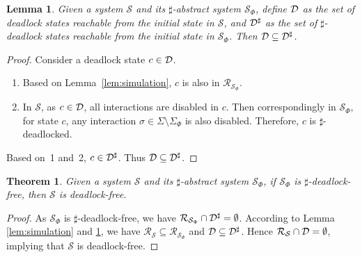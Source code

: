 \documentclass[10pt, a4paper, onecolumn, conference, compsocconf]{IEEEtran}
\newcommand{\sys}{\mathcal{S}}
\newtheorem{theo}{Theorem}
\newtheorem{lemma}{Lemma}
\begin{document}
\begin{lemma}\label{lem:deadlock}
Given a system $\sys$ and its $\sharp$-abstract system $\sys_{\Phi}$, define ${\cal{D}}$ as the set of deadlock states reachable from the initial state in $\sys$, and ${\cal{D}}^\sharp$ as the set of $\sharp$-deadlock states reachable from the initial state in $\sys_{\Phi}$.
Then ${\cal{D}} \subseteq {\cal{D}}^\sharp$.
\end{lemma}

\begin{proof}
Consider a deadlock state $c\in {\cal{D}}$.
\begin{enumerate}
    \item Based on Lemma~\ref{lem:simulation}, $c$ is also in $\mathcal{R}_{\sys_{\Phi}}$.
    \item In $\sys$, as $c \in {\cal{D}}$, all interactions are disabled in $c$. Then correspondingly in $\sys_{\Phi}$, for state $c$, any interaction $\sigma\in \Sigma\setminus \Sigma_{\Phi}$ is also disabled. Therefore, $c$ is $\sharp$-deadlocked.
\end{enumerate}
Based on~1 and~2, $c \in {\cal{D}}^\sharp$. Thus ${\cal{D}} \subseteq {\cal{D}}^\sharp$.
\end{proof}


\begin{theo}\label{the:free}
Given a system $\sys$ and its $\sharp$-abstract system $\sys_{\Phi}$, if $\sys_{\Phi}$ is $\sharp$-deadlock-free, then $\sys$ is deadlock-free.
\end{theo}

\begin{proof}
As $\sys_{\Phi}$ is $\sharp$-deadlock-free, we have $\mathcal{R}_{\sys_{\Phi}}\cap {\cal{D}}^\sharp=\emptyset$. According to Lemma \ref{lem:simulation} and \ref{lem:deadlock}, we have $\mathcal{R}_{\sys}\subseteq \mathcal{R}_{\sys_{\Phi}}$ and ${\cal{D}}\subseteq {\cal{D}}^\sharp$. Hence $\mathcal{R}_{\sys}\cap {\cal{D}}=\emptyset$, implying that $\sys$ is deadlock-free.
\end{proof}
\end{document}
